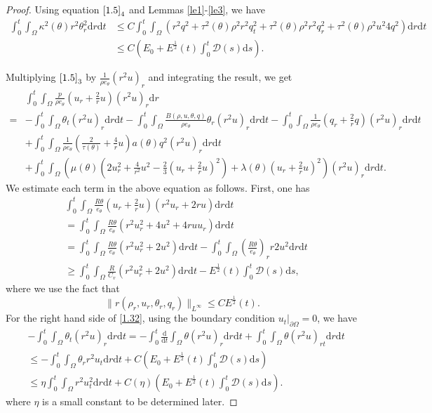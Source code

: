 \documentclass[11pt,reqno]{amsart}
\numberwithin{equation}{section}
\newcommand{\dif}{\mathrm{d}}
\newcommand{\intx}{\int_0^t \int_{\Omega} }
\begin{document}
\begin{proof}
Using equation $\eqref{1.5}_4$ and Lemmas \ref{le1}-\ref{le3}, we have
\begin{align}
\int_0^t \int_{\Omega} \kappa^2(\theta) r^2  \theta_r^2 \dif r \dif t &\le C \int_0^t \int_{\Omega} \left( r^2 q^2+\tau^2(\theta) \rho^2 r^2 q_t^2+\tau^2(\theta) \rho^2 r^2 q_r^2+\tau^2(\theta) \rho^2 u^2 4 q^2\right)\dif r \dif t  \nonumber\\
&\le C(E_0+E^\frac{1}{2}(t) \int_0^t  \mathcal D(s)\dif s). \label{1.31}
\end{align}

Multiplying $\eqref{1.5}_3$ by $\frac{1}{\rho e_\theta} (r^2u)_r$ and integrating the result, we get
\begin{align}
&\int_0^t \int_{\Omega} \frac{p}{\rho e_\theta} (u_r+\frac{2}{r} u) (r^2 u)_r \dif r \nonumber\\
=&-\intx  \theta_t (r^2 u)_r\dif r \dif t-\intx \frac{B(\rho, u, \theta, q)}{\rho e_\theta} \theta_r (r^2 u)_r \dif r \dif t-\intx \frac{1}{\rho e_\theta} (q_r+\frac{2}{r} q) (r^2 u)_r \dif r \dif t \nonumber\\
&+\intx \frac{1}{\rho e_\theta} \left(\frac{2}{\tau(\theta)}+\frac{4}{r} u\right) a(\theta) q^2 (r^2 u)_r \dif r \dif t \nonumber\\
&+ \intx \left(\mu(\theta)\left( 2u_r^2+\frac{4}{r^2}u^2-\frac{2}{3} \left(u_r+\frac{2}{r} u\right)^2\right)+\lambda(\theta)\left(u_r+\frac{2}{r} u\right)^2\right) (r^2 u)_r \dif r \dif t . \label{1.32}
\end{align}
We estimate each term in the above equation as follows.
First, one has
\begin{align*}
&\intx \frac{R\theta}{e_\theta} (u_r+\frac{2}{r} u)(r^2 u_r+2 r u) \dif r \dif t \\
&=\intx \frac{R\theta}{e_\theta} (r^2 u_r^2+4u^2+4 r u u_r)\dif r \dif t\\
&=\intx \frac{R\theta}{e_\theta} (r^2u_r^2+2u^2)\dif r \dif t-\intx \left(\frac{R\theta}{e_\theta}\right)_r r 2u^2 \dif r \dif t\\
&\ge \intx \frac{R}{C_v} (r^2 u_r^2+2u^2)\dif r \dif t - E^\frac{1}{2}(t) \int_0^t  \mathcal D(s)\dif s,
\end{align*}
where we use the fact that
\[
\|r(\rho_r, u_r, \theta_r, q_r)\|_{L^\infty}  \le CE^\frac{1}{2}(t).
\]
For the right hand side of \eqref{1.32},  using the boundary condition $u_t|_{\partial \Omega}=0$, we have
\begin{align*}
&-\intx \theta_t(r^2 u)_r \dif r \dif t =-\int_0^t \frac{\dif}{\dif t} \int_{\Omega} \theta (r^2 u)_r \dif r \dif t +\intx \theta(r^2 u)_{rt} \dif r \dif t \\
&\le -\intx \theta_r r^2 u_t \dif r \dif t +C(E_0+E^\frac{1}{2}(t) \int_0^t  \mathcal D(s)\dif s) \\
&\le \eta \intx r^2 u_t^2 \dif r \dif t +C(\eta) (E_0+E^\frac{1}{2}(t) \int_0^t  \mathcal D(s)\dif s).
\end{align*}
where $\eta$ is  a small constant to be determined later.


\end{proof}
\end{document}
